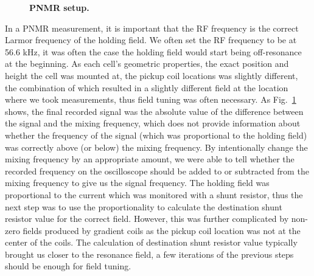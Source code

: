 \begin{figure}[t!]
	\centering
	\caption{{\bf PNMR setup.}}
	\label{PNMR_setup}
\end{figure}

In a PNMR measurement, it is important that the RF frequency is the correct Larmor frequency of the holding field. We often set the RF frequency to be at 56.6 kHz, it was often the case the holding field would start being off-resonance at the beginning. As each cell's geometric properties, the exact position and height the cell was mounted at, the pickup coil locations was slightly different, the combination of which resulted in a slightly different field at the location where we took measurements, thus field tuning was often necessary. As Fig.~\ref{PNMR_setup} shows, the final recorded signal was the absolute value of the difference between the signal and the mixing frequency, which does not provide information about whether the frequency of the signal (which was proportional to the holding field) was correctly above (or below) the mixing frequency. By intentionally change the mixing frequency by an appropriate amount, we were able to tell whether the recorded frequency on the oscilloscope should be added to or subtracted from the mixing frequency to give us the signal frequency. The holding field was proportional to the current which was monitored with a shunt resistor, thus the next step was to use the proportionality to calculate the destination shunt resistor value for the correct field. However, this was further complicated by non-zero fields produced by gradient coils as the pickup coil location was not at the center of the coils. The calculation of destination shunt resistor value typically brought us closer to the resonance field, a few iterations of the previous steps should be enough for field tuning.

